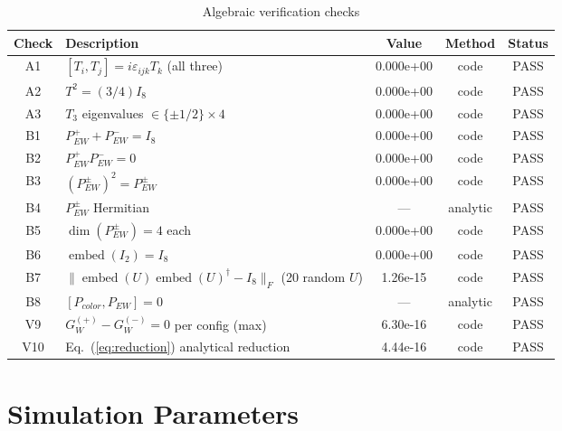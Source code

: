 \documentclass[12pt,a4paper]{article}
\newcommand{\embed}{\operatorname{embed}}
\newcommand{\Id}[1]{I_{#1}}
\newcommand{\Pew}[1]{P^{#1}_{\mathrm{EW}}}
\newcommand{\GW}[1]{G_W^{(#1)}}
\def\mathrm#1{#1}%
\begin{document}
	\begin{table}[htbp]
		\centering
		\caption{Algebraic verification checks}
		\label{tab:algebra}
		\begin{tabular}{clccc}
			\toprule
			Check & Description & Value & Method & Status\\
			\midrule
			A1 & $[T_i,T_j]=i\varepsilon_{ijk}T_k$ (all three) & 0.000e+00 & code & PASS\\
			A2 & $T^2=(3/4)\Id{8}$                              & 0.000e+00 & code & PASS\\
			A3 & $T_3$ eigenvalues $\in\{\pm1/2\}\times4$       & 0.000e+00 & code & PASS\\
			B1 & $\Pew{+}+\Pew{-}=\Id{8}$                       & 0.000e+00 & code & PASS\\
			B2 & $\Pew{+}\Pew{-}=0$                              & 0.000e+00 & code & PASS\\
			B3 & $(\Pew{\pm})^2=\Pew{\pm}$                       & 0.000e+00 & code & PASS\\
			B4 & $\Pew{\pm}$ Hermitian                           & ---       & analytic & PASS\\
			B5 & $\dim(\Pew{\pm})=4$ each                        & 0.000e+00 & code & PASS\\
			B6 & $\embed(I_2)=\Id{8}$                            & 0.000e+00 & code & PASS\\
			B7 & $\|\embed(U)\embed(U)^\dagger-\Id{8}\|_F$
			(20 random $U$)                                  & 1.26e-15  & code & PASS\\
			B8 & $[P_{\mathrm{color}},\Pew{}]=0$                 & ---       & analytic & PASS\\
			V9  & $\GW{+}-\GW{-}=0$ per config (max)             & 6.30e-16  & code & PASS\\
			V10 & Eq.~(\ref{eq:reduction}) analytical reduction & 4.44e-16  & code & PASS\\
			\bottomrule
		\end{tabular}
	\end{table}
	
	\section{Simulation Parameters}
	
\end{document}
